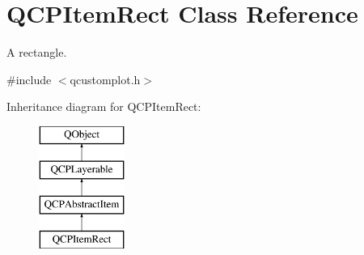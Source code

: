 \hypertarget{class_q_c_p_item_rect}{}\section{Q\+C\+P\+Item\+Rect Class Reference}
\label{class_q_c_p_item_rect}


A rectangle.  




{\ttfamily \#include $<$qcustomplot.\+h$>$}

Inheritance diagram for Q\+C\+P\+Item\+Rect\+:\begin{figure}[H]
\begin{center}
\leavevmode
\includegraphics[height=4.000000cm]{d9/dcc/class_q_c_p_item_rect}
\end{center}
\end{figure}
